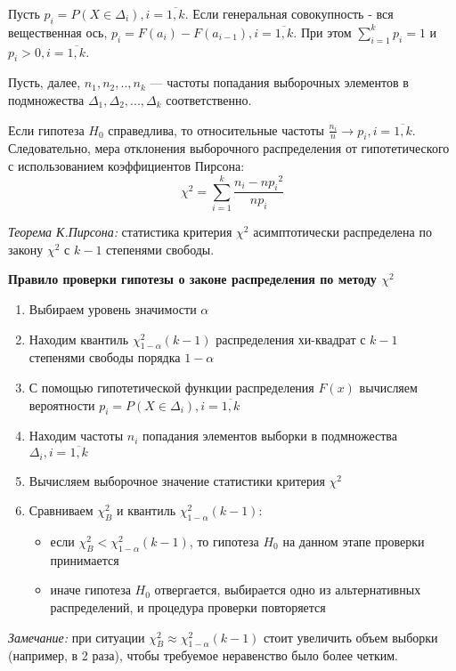 \documentclass[12pt,a4paper]{article}
\begin{document}
Пусть $p_i=P(X\in\Delta_i),i=\overline{1,k}$. Если генеральная совокупность - вся вещественная ось, $p_i=F(a_i)-F(a_{i-1}),i=\overline{1,k}$. При этом $\sum_{i=1}^k{p_i}=1$ и $p_i>0,i=\overline{1,k}$.

Пусть, далее, $n_1,n_2,..,n_k$ — частоты попадания выборочных элементов в подмножества $\Delta_1,\Delta_2,...,\Delta_k$ соответственно.

Если гипотеза $H_0$ справедлива, то относительные частоты $\frac{n_i}{n}\rightarrow p_i, i=\overline{1,k}$. Следовательно, мера отклонения выборочного распределения от гипотетического с использованием коэффициентов Пирсона:
\begin{equation}
    \chi^2=\sum_{i=1}^k{\frac{{n_i-np_i}^2}{np_i}}
\end{equation}

\textit{Теорема К.Пирсона:} статистика критерия $\chi^2$ асимптотически распределена по закону $\chi^2$ с $k-1$ степенями свободы.

\textbf{Правило проверки гипотезы о законе распределения по методу $\chi^2$}
\begin{enumerate}
    \item Выбираем уровень значимости $\alpha$
    \item Находим квантиль $\chi^2_{1-\alpha}(k - 1)$ распределения хи-квадрат с $k-1$ степенями свободы порядка $1-\alpha$
    \item С помощью гипотетической функции распределения $F(x)$ вычисляем вероятности $p_i=P(X\in\Delta_i),i=\overline{1,k}$
    \item Находим частоты $n_i$ попадания элементов выборки в подмножества $\Delta_i,i=\overline{1,k}$
    \item Вычисляем выборочное значение статистики критерия $\chi^2$
    \item Сравниваем $\chi^2_B$ и квантиль $\chi^2_{1-\alpha}(k-1):$
        \begin{itemize}
            \item если $\chi^2_B<\chi^2_{1-\alpha}(k-1)$, то гипотеза $H_0$ на данном этапе проверки принимается
            \item иначе гипотеза $H_0$ отвергается, выбирается одно из альтернативных распределений, и процедура проверки повторяется
        \end{itemize}
\end{enumerate}

\textit{Замечание:} при ситуации $\chi^2_B\approx\chi^2_{1-\alpha}(k-1)$ стоит увеличить объем выборки (например, в 2 раза), чтобы требуемое неравенство было более четким.
\end{document}
